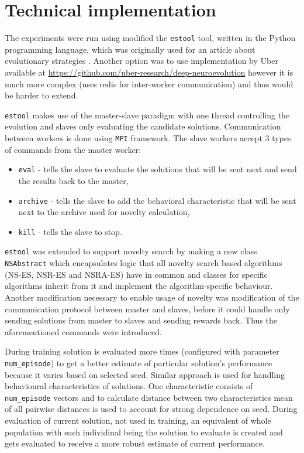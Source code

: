 \chapter{Technical implementation}

The experiments were run using modified the \texttt{estool} tool, written in the Python programming language, which was originally used for an article about evolutionary strategies \cite{ha2017evolving}. Another option was to use implementation by Uber available at \url{https://github.com/uber-research/deep-neuroevolution} however it is much more complex (uses redis for inter-worker communication) and thus would be harder to extend.

\texttt{estool} makes use of the master-slave paradigm with one thread controlling the evolution and slaves only evaluating the candidate solutions. Communication between workers is done using \texttt{MPI} framework. The slave workers accept 3 types of commands from the master worker: \begin{itemize}
    \item \texttt{eval} - tells the slave to evaluate the solutions that will be sent next and send the results back to the master,
    \item \texttt{archive} - tells the slave to add the behavioral characteristic that will be sent next to the archive used for novelty calculation,
    \item \texttt{kill} - tells the slave to stop.
\end{itemize}

\texttt{estool} was extended to support novelty search by making a new class \texttt{NSAbstract} which encapsulates logic that all novelty search based algorithms (NS-ES, NSR-ES and NSRA-ES) have in common and classes for specific algorithms inherit from it and implement the algorithm-specific behaviour. Another modification necessary to enable usage of novelty was modification of the communication protocol between master and slaves, before it could handle only sending solutions from master to slaves and sending rewards back. Thus the aforementioned commands were introduced.

During training solution is evaluated more times (configured with parameter \texttt{num\_episode}) to get a better estimate of particular solution's performance because it varies based on selected seed. Similar approach is used for handling behavioural characteristics of solutions. One characteristic consists of \texttt{num\_episode} vectors and to calculate distance between two characteristics mean of all pairwise distances is used to account for strong dependence on seed. During evaluation of current solution, not used in training, an equivalent of whole population with each individiual being the solution to evaluate is created and gets evaluated to receive a more robust estimate of current performance.

